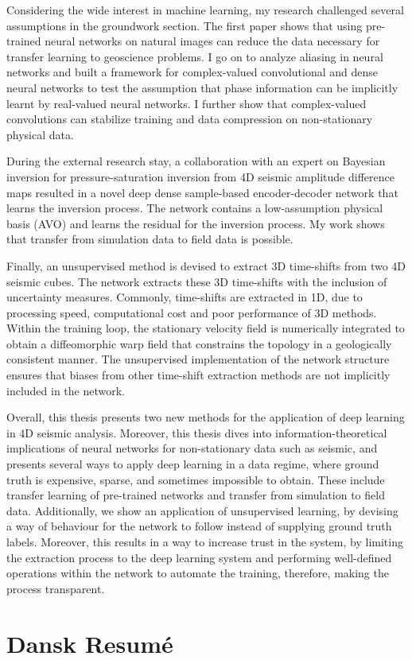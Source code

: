 Considering the wide interest in machine learning, my research challenged several assumptions in the groundwork section. The first paper shows that using pre-trained neural networks on natural images can reduce the data necessary for transfer learning to geoscience problems. I go on to analyze aliasing in neural networks and built a framework for complex-valued convolutional and dense neural networks to test the assumption that phase information can be implicitly learnt by real-valued neural networks. I further show that complex-valued convolutions can stabilize training and data compression on non-stationary physical data.

During the external research stay, a collaboration with an expert on Bayesian inversion for pressure-saturation inversion from 4D seismic amplitude difference maps resulted in a novel deep dense sample-based encoder-decoder network that learns the inversion process. The network contains a low-assumption physical basis (AVO) and learns the residual for the inversion process. My work shows that transfer from simulation data to field data is possible.

Finally, an unsupervised method is devised to extract 3D time-shifts from two 4D seismic cubes. The network extracts these 3D time-shifts with the inclusion of uncertainty measures. Commonly, time-shifts are extracted in 1D, due to processing speed, computational cost and poor performance of 3D methods. Within the training loop, the stationary velocity field is numerically integrated to obtain a diffeomorphic warp field that constrains the topology in a geologically consistent manner. The unsupervised implementation of the network structure ensures that biases from other time-shift extraction methods are not implicitly included in the network.

Overall, this thesis presents two new methods for the application of deep learning in 4D seismic analysis. Moreover, this thesis dives into information-theoretical implications of neural networks for non-stationary data such as seismic, and presents several ways to apply deep learning in a data regime, where ground truth is expensive, sparse, and sometimes impossible to obtain. These include transfer learning of pre-trained networks and transfer from simulation to field data. Additionally, we show an application of unsupervised learning, by devising a way of behaviour for the network to follow instead of supplying ground truth labels. Moreover, this results in a way to increase trust in the system, by limiting the extraction process to the deep learning system and performing well-defined operations within the network to automate the training, therefore, making the process transparent.


\chapter{Dansk Resum\'e}
